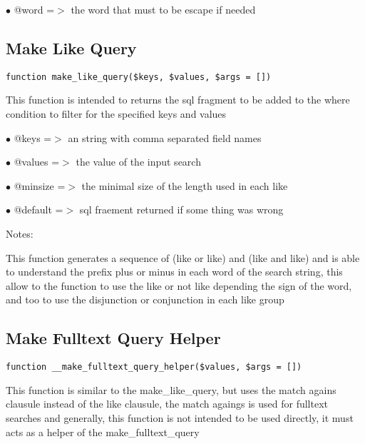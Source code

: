 \documentclass[a4paper]{book}
\begin{document}
\begin{compactitem}
\item[\color{myblue}$\bullet$] @word =$>$ the word that must to be escape if needed
\end{compactitem}

\hypertarget{toc266}{}
\subsection{Make Like Query}

\begin{lstlisting}
function make_like_query($keys, $values, $args = [])
\end{lstlisting}

This function is intended to returns the sql fragment to be added to the
where condition to filter for the specified keys and values

\begin{compactitem}
\item[\color{myblue}$\bullet$] @keys    =$>$ an string with comma separated field names
\item[\color{myblue}$\bullet$] @values  =$>$ the value of the input search
\item[\color{myblue}$\bullet$] @minsize =$>$ the minimal size of the length used in each like
\item[\color{myblue}$\bullet$] @default =$>$ sql fraement returned if some thing was wrong
\end{compactitem}

Notes:

This function generates a sequence of (like or like) and (like and like)
and is able to understand the prefix plus or minus in each word of the
search string, this allow to the function to use the like or not like
depending the sign of the word, and too to use the disjunction or
conjunction in each like group

\hypertarget{toc267}{}
\subsection{Make Fulltext Query Helper}

\begin{lstlisting}
function __make_fulltext_query_helper($values, $args = [])
\end{lstlisting}

This function is similar to the make\_like\_query, but uses the match agains
clausule instead of the like clausule, the match agaings is used for
fulltext searches and generally, this function is not intended to be used
directly, it must acts as a helper of the make\_fulltext\_query
\end{document}
